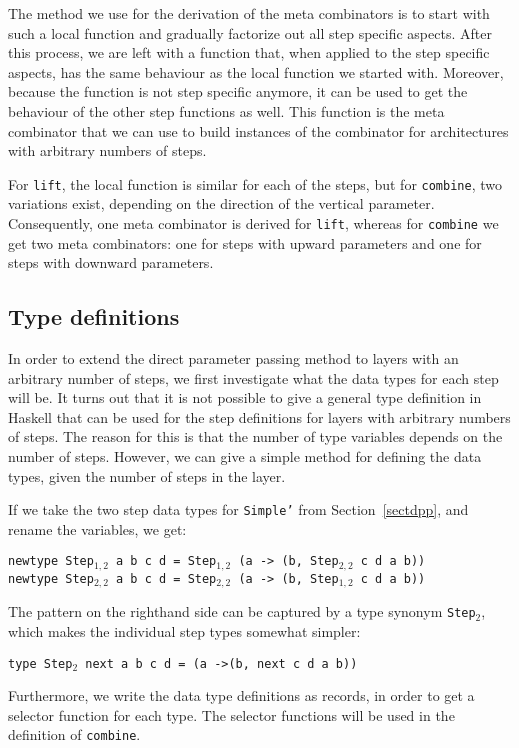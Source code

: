 The method we use for the derivation of the meta combinators is to start with such a local function and gradually factorize out all step specific aspects. After this process, we are left with a function that, when applied to the step specific aspects, has the same behaviour as the local function we started with. Moreover, because the function is not step specific anymore, it can be used to get the behaviour of the other step functions as well. This function is the meta combinator that we can use to build instances of the combinator for architectures with arbitrary numbers of steps.

 For \texttt{lift}, the local function is similar for each of the steps, but for \texttt{combine}, two variations exist, depending on the direction of the vertical parameter. Consequently, one meta combinator is derived for \texttt{lift}, whereas for \texttt{combine} we get two meta combinators: one for steps with upward parameters and one for steps with downward parameters.
 
 
\subsection{Type definitions} \label{subsecttypedef}

In order to extend the direct parameter passing method to layers with an arbitrary number of steps, we first investigate what the data types for each step will be. It turns out that it is not possible to give a general type definition in Haskell that can be used for the step definitions for layers with arbitrary numbers of steps. The reason for this is that the number of type variables depends on the number of steps. However, we can give a simple method for defining the data types, given the number of steps in the layer.

If we take the two step data types for \texttt{Simple'} from Section~\ref{sectdpp}, and rename the variables, we get:

{\tt newtype Step$_{1,2}$ a b c d = Step$_{1,2}$ (a -> (b, Step$_{2,2}$ c d a b))}\\
{\tt newtype Step$_{2,2}$ a b c d = Step$_{2,2}$ (a -> (b, Step$_{1,2}$ c d a b))}

The pattern on the righthand side can be captured by a type synonym \texttt{Step$_2$}, which makes the individual step types somewhat simpler:

{\tt type Step$_2$ next a b c d = (a ->(b, next c d a b))}

Furthermore, we write the data type definitions as records, in order to get a selector function for each type. The selector functions will be used in the definition of \texttt{combine}.


